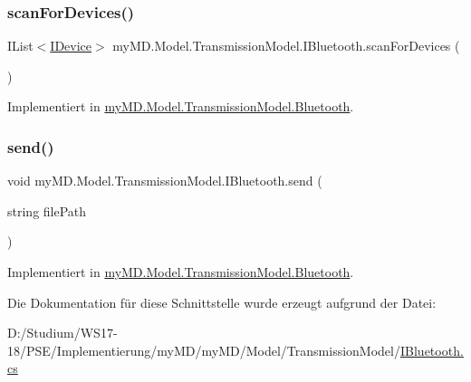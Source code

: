 \subsubsection{\texorpdfstring{scan\+For\+Devices()}{scanForDevices()}}
{\footnotesize\ttfamily I\+List$<$\mbox{\hyperlink{interfacemy_m_d_1_1_model_interface_1_1_transmission_model_interface_1_1_i_device}{I\+Device}}$>$ my\+M\+D.\+Model.\+Transmission\+Model.\+I\+Bluetooth.\+scan\+For\+Devices (\begin{DoxyParamCaption}{ }\end{DoxyParamCaption})}



Implementiert in \mbox{\hyperlink{classmy_m_d_1_1_model_1_1_transmission_model_1_1_bluetooth_a551c99750193ce8a6fc03c92864d24e8}{my\+M\+D.\+Model.\+Transmission\+Model.\+Bluetooth}}.

\mbox{\label{interfacemy_m_d_1_1_model_1_1_transmission_model_1_1_i_bluetooth_a3ae2f74750177a849765df54ea32f788}} 
\subsubsection{\texorpdfstring{send()}{send()}}
{\footnotesize\ttfamily void my\+M\+D.\+Model.\+Transmission\+Model.\+I\+Bluetooth.\+send (\begin{DoxyParamCaption}\item[{string}]{file\+Path }\end{DoxyParamCaption})}



Implementiert in \mbox{\hyperlink{classmy_m_d_1_1_model_1_1_transmission_model_1_1_bluetooth_a5be7341663a848cdc5bd2209c11890ad}{my\+M\+D.\+Model.\+Transmission\+Model.\+Bluetooth}}.



Die Dokumentation für diese Schnittstelle wurde erzeugt aufgrund der Datei\+:\begin{DoxyCompactItemize}
\item 
D\+:/\+Studium/\+W\+S17-\/18/\+P\+S\+E/\+Implementierung/my\+M\+D/my\+M\+D/\+Model/\+Transmission\+Model/\mbox{\hyperlink{_i_bluetooth_8cs}{I\+Bluetooth.\+cs}}\end{DoxyCompactItemize}
